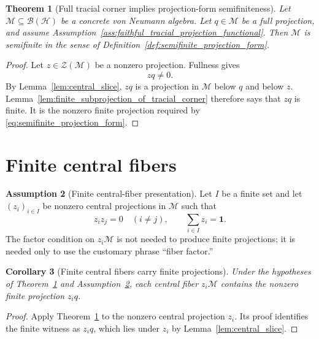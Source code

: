 \documentclass[11pt,reqno]{amsart}
\numberwithin{equation}{section}
\newtheorem{theorem}{Theorem}[section]
\newtheorem{corollary}[theorem]{Corollary}
\theoremstyle{definition}
\newtheorem{assumption}[theorem]{Assumption}
\theoremstyle{remark}
\newcommand{\cB}{\mathcal B}
\newcommand{\cH}{\mathcal H}
\newcommand{\cM}{\mathcal M}
\newcommand{\cZ}{\mathcal Z}
\newcommand{\id}{\mathbf 1}
\begin{document}
\begin{theorem}[Full tracial corner implies projection-form semifiniteness]
\label{thm:full_tracial_corner_semifinite}
Let $\cM\subseteq\cB(\cH)$ be a concrete von Neumann algebra.  Let
$q\in\cM$ be a full projection, and assume
Assumption~\ref{ass:faithful_tracial_projection_functional}.  Then $\cM$ is
semifinite in the sense of Definition~\ref{def:semifinite_projection_form}.
\end{theorem}

\begin{proof}
Let $z\in\cZ(\cM)$ be a nonzero projection.  Fullness gives
\begin{equation}
  zq\neq0.
  \label{eq:central_slice_nonzero}
\end{equation}
By Lemma~\ref{lem:central_slice}, $zq$ is a projection in $\cM$ below $q$
and below $z$.  Lemma~\ref{lem:finite_subprojection_of_tracial_corner}
therefore says that $zq$ is finite.  It is the nonzero finite projection
required by \eqref{eq:semifinite_projection_form}.
\end{proof}

\section{Finite central fibers}
\label{sec:finite_fibers}

\begin{assumption}[Finite central-fiber presentation]
\label{ass:finite_central_fibers}
Let $I$ be a finite set and let $(z_i)_{i\in I}$ be nonzero central
projections in $\cM$ such that
\begin{equation}
  z_i z_j=0\quad (i\neq j),
  \qquad
  \sum_{i\in I}z_i=\id.
  \label{eq:finite_central_partition}
\end{equation}
The factor condition on $z_i\cM$ is not needed to produce finite projections;
it is needed only to use the customary phrase ``fiber factor.''
\end{assumption}

\begin{corollary}[Finite central fibers carry finite projections]
\label{cor:finite_fiber_finite_projection}
Under the hypotheses of
Theorem~\ref{thm:full_tracial_corner_semifinite} and
Assumption~\ref{ass:finite_central_fibers}, each central fiber $z_i\cM$
contains the nonzero finite projection $z_iq$.
\end{corollary}

\begin{proof}
Apply Theorem~\ref{thm:full_tracial_corner_semifinite} to the nonzero central
projection $z_i$.  Its proof identifies the finite witness as $z_iq$, which
lies under $z_i$ by Lemma~\ref{lem:central_slice}.
\end{proof}
\end{document}
